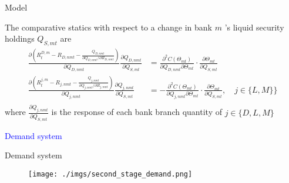 \documentclass[notes,11pt, aspectratio=169]{beamer}
\begin{document}
\begin{frame}{Model}


    The comparative statics with respect to a change in bank $m$ 's liquid security holdings $Q_{S, m t}$ are
$$
\begin{aligned}
\frac{\partial\left(R_t^{D, m}-R_{D, n m t}-\frac{Q_{D, n m t}}{\partial Q_{D, n m t} / \partial R_{D, n m t}}\right)}{\partial Q_{D, n m t}} \frac{\partial Q_{D, n m t}}{\partial Q_{S, m t}} & =\frac{\partial^2 C\left(\Theta_{m t}\right)}{\partial Q_{D, n m t} \partial \Theta_{m t}} \cdot \frac{\partial \Theta_{m t}}{\partial Q_{S, m t}} \\
\frac{\partial\left(R_t^{j, m}-R_{j, n m t}-\frac{Q_{j, n m t}}{\partial Q_{j, n m t} / \partial R_{j, n m t}}\right)}{\partial Q_{j, n m t}} \frac{\partial Q_{j, n m t}}{\partial Q_{S, m t}} & =-\frac{\partial^2 C\left(\Theta_{m t}\right)}{\partial Q_{j, n m t} \partial \Theta_{m t}} \cdot \frac{\partial \Theta_{m t}}{\partial Q_{S, m t}}, \quad j \in \{ L,M\} \}  \\
\end{aligned}
$$
 where $\frac{\partial Q_{j, n m t}}{\partial Q_{S, m t}}$ is the response of each bank branch quantity of $j \in \{D,L,M \}$ %
\end{frame}


\begin{frame}
    \textcolor{blue}{\huge{\centerline{Demand system}}}
\end{frame}


  
\begin{frame}{Demand system}\label{demand}
    \vspace{0.5cm}
      
        \begin{figure}[t*]
          \centering
    
          \texttt{[image: ./imgs/second\_stage\_demand.png]}
       
        \end{figure}

        \hyperlink{firststage}{}
        
      \end{frame}
\end{document}
